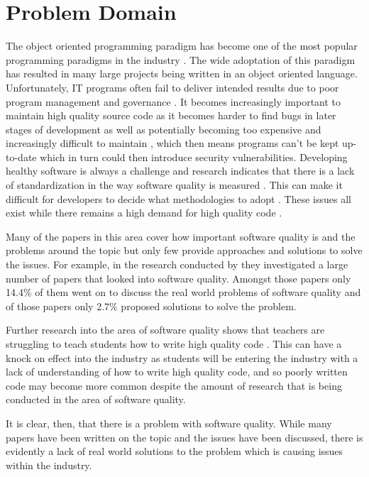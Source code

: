 \section{Problem Domain}
The object oriented programming paradigm has become one of the most popular programming paradigms in the industry \citep{6606742}. The wide adoptation of this paradigm has resulted in many large projects being written in an object oriented language.
Unfortunately, IT programs often fail to deliver intended results due to poor program management and governance \citep{7372958}. It becomes increasingly important to maintain high quality source code as it becomes harder to find bugs in later stages of development \citep{8681007} as well as potentially becoming too expensive and increasingly difficult to maintain \citep{8802820, 10.1145/2507288.2507312, 10.1145/3379597.3387457, 6606742, 7372958}, which then means programs can't be kept up-to-date which in turn could then introduce security vulnerabilities.
Developing healthy software is always a challenge \citep{8681007} and research indicates that there is a lack of standardization in the way software quality is measured \citep{6606742, 8681007}. This can make it difficult for developers to decide what methodologies to adopt \citep{6606742}. These issues all exist while there remains a high demand for high quality code \citep{6606742}.

Many of the papers in this area cover how important software quality is and the problems around the topic but only few provide approaches and solutions to solve the issues. For example, in the research conducted by \cite{6606742} they investigated a large number of papers that looked into software quality. Amongst those papers only 14.4\% of them went on to discuss the real world problems of software quality and of those papers only 2.7\% proposed solutions to solve the problem.

Further research into the area of software quality shows that teachers are struggling to teach students how to write high quality code \citep{10.1145/3428029.3428047}. This can have a knock on effect into the industry as students will be entering the industry with a lack of understanding of how to write high quality code, and so poorly written code may become more common despite the amount of research that is being conducted in the area of software quality.

It is clear, then, that there is a problem with software quality. While many papers have been written on the topic and the issues have been discussed, there is evidently a lack of real world solutions to the problem which is causing issues within the industry.

